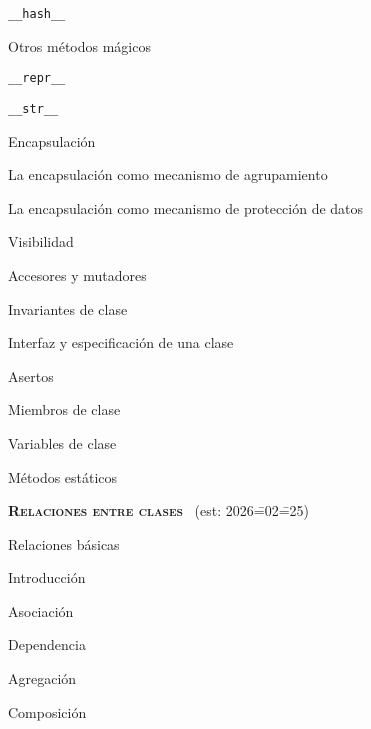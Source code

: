 \begin{longenum}
\begin{longenum}
\begin{longenum}
\begin{longenum}
                \item \texttt{\_\_hash\_\_}
            \end{longenum}
            \item Otros métodos mágicos
            \begin{longenum}
                \item \texttt{\_\_repr\_\_}
                \item \texttt{\_\_str\_\_}
            \end{longenum}
        \end{longenum}
        \item Encapsulación
        \begin{longenum}
            \item La encapsulación como mecanismo de agrupamiento
            \item La encapsulación como mecanismo de protección de datos
            \begin{longenum}
                \item Visibilidad
                \item Accesores y mutadores
                \item Invariantes de clase
                \item Interfaz y especificación de una clase
                \item Asertos
            \end{longenum}
        \end{longenum}
        \item Miembros de clase
        \begin{longenum}
            \item Variables de clase
            \item Métodos estáticos
        \end{longenum}
    \end{longenum}
    \item \textbf{\textsc{Relaciones entre clases}} \ (est: 2026\==02\==25)
    \begin{longenum}
        \item Relaciones básicas
        \begin{longenum}
            \item Introducción
            \item Asociación
            \item Dependencia
            \item Agregación
            \item Composición

\end{longenum}
\end{longenum}
\end{longenum}
